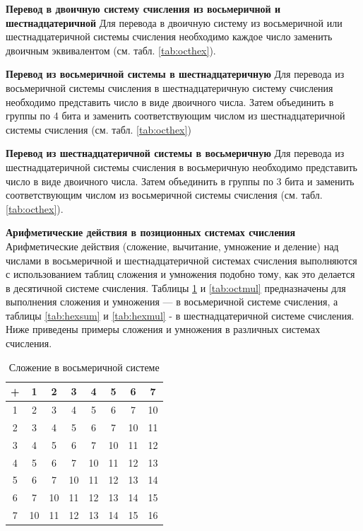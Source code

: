 \documentclass[a4paper]{article}
\begin{document}
\textbf{Перевод в двоичную систему счисления из восьмеричной и шестнадцатеричной}
Для перевода в двоичную систему из восьмеричной или шестнадцатеричной системы счисления необходимо каждое число заменить двоичным эквивалентом (см. табл. \ref{tab:octhex}).

\textbf{Перевод из восьмеричной системы в шестнадцатеричную}
Для перевода из восьмеричной системы счисления в шестнадцатеричную систему счисления необходимо представить число в виде двоичного числа. Затем объединить в группы по 4 бита и заменить соответствующим числом из шестнадцатеричной системы счисления (см. табл. \ref{tab:octhex})

\textbf{Перевод из шестнадцатеричной системы в восьмеричную}
Для перевода из шестнадцатеричной системы счисления в восьмеричную необходимо представить число в виде двоичного числа. Затем объединить в группы по 3 бита и заменить соответствующим числом из восьмеричной системы счисления (см. табл. \ref{tab:octhex}).

\textbf{Арифметические действия в позиционных системах счисления}
Арифметические действия (сложение, вычитание, умножение и деление) над числами в восьмеричной и шестнадцатеричной системах счисления выполняются с использованием таблиц сложения и умножения подобно тому, как это делается в десятичной системе счисления. Таблицы \ref{tab:octsum} и \ref{tab:octmul} предназначены для выполнения сложения и умножения --- в восьмеричной системе счисления, а таблицы \ref{tab:hexsum} и \ref{tab:hexmul} - в шестнадцатеричной системе счисления. Ниже приведены примеры сложения и умножения в различных системах счисления.

\begin{table}[h]
  \caption{Сложение в восьмеричной системе}
  \begin{center}\label{tab:octsum}
\begin{tabular}{|c|c|c|c|c|c|c|c|}
  \hline
  + & 1 & 2 & 3 & 4 & 5 & 6 & 7\tabularnewline
\hline
1 & 2 & 3 & 4 & 5 & 6 & 7 & 10\tabularnewline
\hline
2 & 3 & 4 & 5 & 6 & 7 & 10 & 11\tabularnewline
\hline
3 & 4 & 5 & 6 & 7 & 10 & 11 & 12\tabularnewline
\hline
4 & 5 & 6 & 7 & 10 & 11 & 12 & 13\tabularnewline
\hline
5 & 6 & 7 & 10 & 11 & 12 & 13 & 14\tabularnewline
\hline
6 & 7 & 10 & 11 & 12 & 13 & 14 & 15\tabularnewline
\hline
7 & 10 & 11 & 12 & 13 & 14 & 15 & 16\tabularnewline
                                  \hline
\end{tabular}
\end{center}
\end{table}
\end{document}
